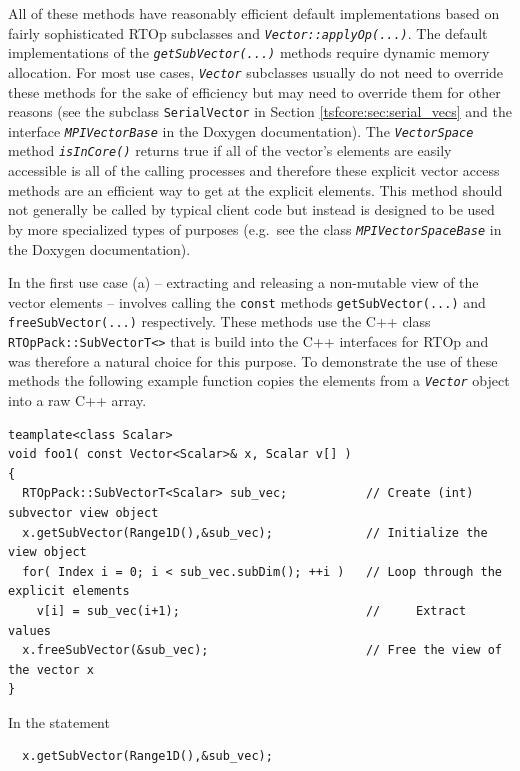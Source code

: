 {}\noindent{}All of these methods have reasonably efficient default
implementations based on fairly sophisticated RTOp subclasses and
{}\texttt{\textit{Vector::applyOp(\-...)}}.  The default
implementations of the {}\texttt{\textit{getSubVector(...)}} methods
require dynamic memory allocation.  For most use cases,
{}\texttt{\textit{Vector}} subclasses usually do not need to override
these methods for the sake of efficiency but may need to override them
for other reasons (see the subclass {}\texttt{SerialVector} in Section
{}\ref{tsfcore:sec:serial_vecs} and the interface
{}\texttt{\textit{MPI\-Vector\-Base}} in the Doxygen documentation).
The {}\texttt{\textit{Vector\-Space}} method
{}\texttt{\textit{isInCore()}} returns true if all of the vector's
elements are easily accessible is all of the calling processes and
therefore these explicit vector access methods are an efficient way to
get at the explicit elements.  This method should not generally be
called by typical client code but instead is designed to be used by
more specialized types of purposes (e.g.~see the class
{}\texttt{\textit{MPI\-Vector\-Space\-Base}} in the Doxygen
documentation).

In the first use case (a) -- extracting and releasing a non-mutable
view of the vector elements -- involves calling the {}\texttt{const}
methods {}\texttt{get\-Sub\-Vector(...)} and
{}\texttt{free\-Sub\-Vector(...)}  respectively.  These methods use
the C++ class {}\texttt{RTOp\-Pack::\-Sub\-VectorT<>} that is build
into the C++ interfaces for RTOp and was therefore a natural choice
for this purpose.  To demonstrate the use of these methods the
following example function copies the elements from a
{}\texttt{\textit{Vector}} object into a raw C++ array.

{\scriptsize\begin{verbatim}
teamplate<class Scalar>
void foo1( const Vector<Scalar>& x, Scalar v[] )
{
  RTOpPack::SubVectorT<Scalar> sub_vec;           // Create (int) subvector view object
  x.getSubVector(Range1D(),&sub_vec);             // Initialize the view object
  for( Index i = 0; i < sub_vec.subDim(); ++i )   // Loop through the explicit elements
    v[i] = sub_vec(i+1);                          //     Extract values
  x.freeSubVector(&sub_vec);                      // Free the view of the vector x
}
\end{verbatim}}

{}\noindent{}In the statement

{\scriptsize\begin{verbatim}
  x.getSubVector(Range1D(),&sub_vec);
\end{verbatim}}


